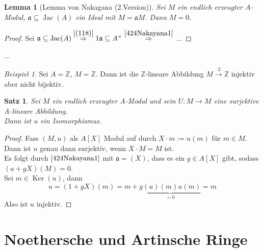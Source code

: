 \documentclass[10pt,a4paper]{article}
\newcommand{\Z}{\ensuremath{\mathbb{Z}}}
\newcommand{\Ker}{\ensuremath{\operatorname{Ker}}}
\newcommand{\Jac}{\operatorname{Jac}}
\newcounter{thm}[section]
\theoremstyle{definition}
\theoremstyle{plain}
\newtheorem{lem}[thm]{Lemma}
\newtheorem{satz}[thm]{Satz}
\theoremstyle{remark}
\newtheorem{exm}[thm]{Beispiel}
\begin{document}
\begin{lem}[Lemma von Nakagana (2.Version)]
	\label{425Nakagana2}
	Sei $M$ ein endlich erzeugter $A$-Modul, $\mathfrak a\subseteq\Jac(A)$ ein Ideal mit $M=\mathfrak aM$. Dann $M=0$.
\end{lem}
\begin{proof}
	Sei $\mathfrak a\subseteq \Jac(A)\overset{\ref{(118)}}\Rightarrow1\mathfrak a\subseteq A^\times\overset{\ref{424Nakayana1}}\Rightarrow$
		...%
\end{proof}
... %
\begin{exm}
	Sei $A=\Z$, $M=\Z$. Dann ist die $\Z$-lineare Abbildung $M\xrightarrow{\cdot 2}\Z$ injektiv aber nicht bijektiv.
\end{exm}
\begin{satz}
	\label{427}Sei $M$ ein endlich erzeugter A-Modul und sein $U:M\rightarrow M$ eine surjektive A-lineare Abbildung.\\
	Dann ist $u$ ein Isomorphismus.
\end{satz}
\begin{proof}
	Fass $(M,u)$ als $A[X]$ Modul auf durch $X\cdot m:=u(m)$ für $m\in M$.\\
	Dann ist $u$ genau dann surjektiv, wenn $X\cdot M=M$ ist.\\
	Es folgt durch $\ref{424Nakayana1}$ mit $\mathfrak a=(X)$, dass es ein $g\in A[X]$ gibt, sodass $(a+gX)(M)=0$.\\
	Sei $m\in\Ker(u)$, dann
	\[u=(1+gX)(m)=m+\underbrace{g(u)(m)u(m)}_{=0}=m\]
	Also ist $u$ injektiv.
\end{proof}
\section{Noethersche und Artinsche Ringe}
\end{document}
